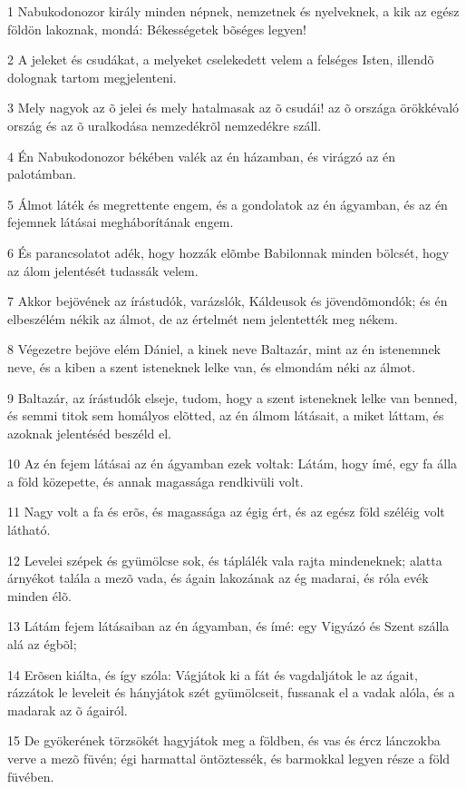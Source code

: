 \par 1 Nabukodonozor király minden népnek, nemzetnek és nyelveknek, a kik az egész földön lakoznak, mondá: Békességetek bõséges legyen!
\par 2 A jeleket és csudákat, a melyeket cselekedett velem a felséges Isten, illendõ dolognak tartom megjelenteni.
\par 3 Mely nagyok az õ jelei és mely hatalmasak az õ csudái! az õ országa örökkévaló ország és az õ uralkodása nemzedékrõl nemzedékre száll.
\par 4 Én Nabukodonozor békében valék az én házamban, és virágzó az én palotámban.
\par 5 Álmot láték és megrettente engem, és a gondolatok az én ágyamban, és az én fejemnek látásai megháborítának engem.
\par 6 És parancsolatot adék, hogy hozzák elõmbe Babilonnak minden bölcsét, hogy az álom jelentését tudassák velem.
\par 7 Akkor bejövének az írástudók, varázslók, Káldeusok és jövendõmondók; és én elbeszélém nékik az álmot, de az értelmét nem jelentették meg nékem.
\par 8 Végezetre bejöve elém Dániel, a kinek neve Baltazár, mint az én istenemnek neve, és a kiben a szent isteneknek lelke van, és elmondám néki az álmot.
\par 9 Baltazár, az írástudók elseje, tudom, hogy a szent isteneknek lelke van benned, és semmi titok sem homályos elõtted, az én álmom látásait, a miket láttam, és azoknak jelentéséd beszéld el.
\par 10 Az én fejem látásai az én ágyamban ezek voltak: Látám, hogy ímé, egy fa álla a föld közepette, és annak magassága rendkivüli volt.
\par 11 Nagy volt a fa és erõs, és magassága az égig ért, és az egész föld széléig volt látható.
\par 12 Levelei szépek és gyümölcse sok, és táplálék vala rajta mindeneknek; alatta árnyékot talála a mezõ vada, és ágain lakozának az ég madarai, és róla evék minden élõ.
\par 13 Látám fejem látásaiban az én ágyamban, és ímé: egy Vigyázó és Szent szálla alá az égbõl;
\par 14 Erõsen kiálta, és így szóla: Vágjátok ki a fát és vagdaljátok le az ágait, rázzátok le leveleit és hányjátok szét gyümölcseit, fussanak el a vadak alóla, és a madarak az õ ágairól.
\par 15 De gyökerének törzsökét hagyjátok meg a földben, és vas és ércz lánczokba verve a mezõ füvén; égi harmattal öntöztessék, és barmokkal legyen része a föld füvében.
